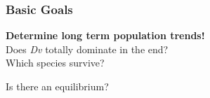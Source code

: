 \begin{frame}
   \frametitle{Basic Goals}
\begin{center}
		{\Large{\textbf{Determine long term population trends!}}}\\


\vspace{2.5em}
		Does \textit{Dv} totally dominate in the end?\\
\vspace{.5em}
		Which species survive?\\
\vspace{.5em}

		Is there an equilibrium?

\end{center}

\end{frame}


%
%
%
%
%
%
%
%
%
%
%
%
%
%
%
%
%
%
%
%
%
%
%
%
%
%
%


